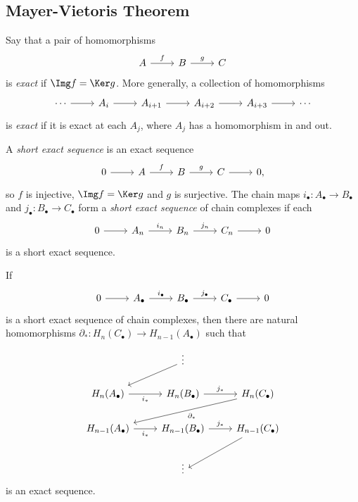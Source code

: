 \documentclass[12pt]{article}
\begin{document}
\subsection{Mayer-Vietoris Theorem}
\label{sub:mvt}

\begin{definition}
	Say that a pair of homomorphisms
	\[
	\begin{tikzcd}
		A \arrow[r, "f"] & B \arrow[r, "g"] & C
	\end{tikzcd}
	\]
	is \emph{exact} if $\Img f = \Ker g$. More generally, a collection of homomorphisms
	 \[
	\begin{tikzcd}
		\cdots \arrow[r] & A_i \arrow[r] & A_{i+1} \arrow[r] & A_{i+2} \arrow[r] & A_{i+3} \arrow[r] & \cdots
	\end{tikzcd}
	\]
	is \emph{exact} if it is exact at each $A_j$, where $A_j$ has a homomorphism in and out.

	A \emph{short exact sequence} is an exact sequence
	\[
	\begin{tikzcd}
		0 \arrow[r] & A \arrow[r, "f"] & B \arrow[r, "g"] & C \arrow[r] & 0,
	\end{tikzcd}
	\]
	so $f$ is injective, $\Img f = \Ker g$ and $g$ is surjective. The chain maps $i_\bullet : A_\bullet \to B_\bullet$ and  $j_\bullet : B_\bullet \to C_\bullet$ form a \emph{short exact sequence} of chain complexes if each
	\[
	\begin{tikzcd}
		0 \arrow[r] & A_n \arrow[r, "i_n"] & B_n \arrow[r, "j_n"] & C_n \arrow[r] & 0
	\end{tikzcd}
	\]
	is a short exact sequence.
\end{definition}

\begin{theorem}
	If
	\[
	\begin{tikzcd}
		0 \arrow[r] & A_\bullet \arrow[r, "i_\bullet"] & B_\bullet \arrow[r, "j_\bullet"] & C_\bullet \arrow[r] & 0
	\end{tikzcd}
	\]
	is a short exact sequence of chain complexes, then there are natural homomorphisms $\partial_\ast : H_n(C_\bullet) \to H_{n-1}(A_\bullet)$ such that
	\begin{equation*}
	\begin{tikzcd}
		& \vdots \arrow[dl] & \\
		 H_n(A_\bullet) \arrow[r, "i_\ast"'] & H_n(B_\bullet) \arrow[r, "j_\ast"] & H_n(C_\bullet) \arrow[dll, "\partial_\ast"] \\
						    H_{n-1}(A_\bullet) \arrow[r, "i_\ast"'] & H_{n-1}(B_\bullet) \arrow[r, "j_\ast"] & H_{n-1}(C_\bullet) \arrow[dl] \\
						    & \vdots &
	\end{tikzcd}
	\end{equation*}
	is an exact sequence.
\end{theorem}
\end{document}
